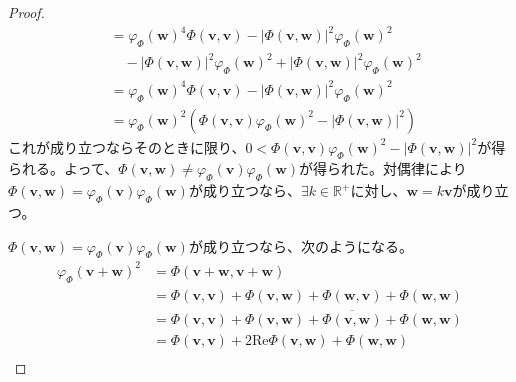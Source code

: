 \documentclass[dvipdfmx]{jsarticle}
\begin{document}
\begin{proof}
\begin{align*}
&= {\varphi_{\varPhi}\left( \mathbf{w} \right)}^{4}\varPhi\left( \mathbf{v,v} \right) - \left| \varPhi\left( \mathbf{v},\mathbf{w} \right) \right|^{2}{\varphi_{\varPhi}\left( \mathbf{w} \right)}^{2} \\
&\quad - \left| \varPhi\left( \mathbf{v},\mathbf{w} \right) \right|^{2}{\varphi_{\varPhi}\left( \mathbf{w} \right)}^{2} + \left| \varPhi\left( \mathbf{v},\mathbf{w} \right) \right|^{2}{\varphi_{\varPhi}\left( \mathbf{w} \right)}^{2}\\
&= {\varphi_{\varPhi}\left( \mathbf{w} \right)}^{4}\varPhi\left( \mathbf{v,v} \right) - \left| \varPhi\left( \mathbf{v},\mathbf{w} \right) \right|^{2}{\varphi_{\varPhi}\left( \mathbf{w} \right)}^{2}\\
&= {\varphi_{\varPhi}\left( \mathbf{w} \right)}^{2}\left( \varPhi\left( \mathbf{v,v} \right){\varphi_{\varPhi}\left( \mathbf{w} \right)}^{2} - \left| \varPhi\left( \mathbf{v},\mathbf{w} \right) \right|^{2} \right)
\end{align*}
これが成り立つならそのときに限り、$0 < \varPhi\left( \mathbf{v,v} \right){\varphi_{\varPhi}\left( \mathbf{w} \right)}^{2} - \left| \varPhi\left( \mathbf{v},\mathbf{w} \right) \right|^{2}$が得られる。よって、$\varPhi\left( \mathbf{v},\mathbf{w} \right) \neq \varphi_{\varPhi}\left( \mathbf{v} \right)\varphi_{\varPhi}\left( \mathbf{w} \right)$が得られた。対偶律により$\varPhi\left( \mathbf{v},\mathbf{w} \right) = \varphi_{\varPhi}\left( \mathbf{v} \right)\varphi_{\varPhi}\left( \mathbf{w} \right)$が成り立つなら、$\exists k \in \mathbb{R}^{+}$に対し、$\mathbf{w} = k\mathbf{v}$が成り立つ。\par
$\varPhi\left( \mathbf{v},\mathbf{w} \right) = \varphi_{\varPhi}\left( \mathbf{v} \right)\varphi_{\varPhi}\left( \mathbf{w} \right)$が成り立つなら、次のようになる。
\begin{align*}
{\varphi_{\varPhi}\left( \mathbf{v} + \mathbf{w} \right)}^{2} &= \varPhi\left( \mathbf{v} + \mathbf{w},\mathbf{v} + \mathbf{w} \right)\\
&= \varPhi\left( \mathbf{v},\mathbf{v} \right) + \varPhi\left( \mathbf{v},\mathbf{w} \right) + \varPhi\left( \mathbf{w},\mathbf{v} \right) + \varPhi\left( \mathbf{w},\mathbf{w} \right)\\
&= \varPhi\left( \mathbf{v},\mathbf{v} \right) + \varPhi\left( \mathbf{v},\mathbf{w} \right) + \overline{\varPhi\left( \mathbf{v},\mathbf{w} \right)} + \varPhi\left( \mathbf{w},\mathbf{w} \right)\\
&= \varPhi\left( \mathbf{v},\mathbf{v} \right) + 2\mathrm{Re}{\varPhi\left( \mathbf{v},\mathbf{w} \right)} + \varPhi\left( \mathbf{w},\mathbf{w} \right)\\

\end{align*}
\end{proof}
\end{document}
